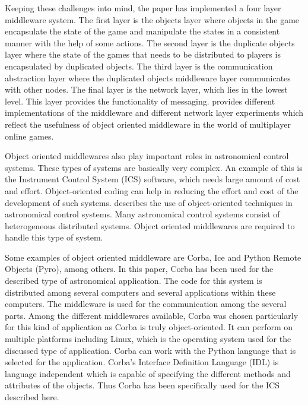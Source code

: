 \documentclass{acm_proc_article-sp}
\begin{document}
Keeping these challenges into mind, the paper has implemented a four layer middleware system. The first layer is the objects layer where objects in the game encapsulate the state of the game and manipulate the states in a consistent manner with the help of some actions. The second layer is the duplicate objects layer where the state of the games that needs to be distributed to players is encapsulated by duplicated objects. The third layer is the communication abstraction layer where the duplicated objects middleware layer communicates with other nodes. The final layer is the network layer, which lies in the lowest level. This layer provides the functionality of messaging. \cite{Denault:2008p8364} provides different implementations of the middleware and different network layer experiments which reflect the usefulness of object oriented middleware in the world of multiplayer online games.




Object oriented middlewares also play important roles in astronomical control systems. These types of systems are basically very complex. An example of this is the Instrument Control System (ICS) software, which needs large amount of cost and effort. Object-oriented coding can help in reducing the effort and cost of the development of such systems. \cite{Dipper:2004p8366} describes the use of object-oriented techniques in astronomical control systems. Many astronomical control systems consist of heterogeneous distributed systems. Object oriented middlewares are required to handle this type of system.

Some examples of object oriented middleware are Corba, Ice and Python Remote Objects (Pyro), among others. In this paper, Corba has been used for the described type of astronomical application. The code for this system is distributed among several computers and several applications within these computers. The middleware is used for the communication among the several parts. Among the different middlewares available, Corba was chosen particularly for this kind of application as Corba is truly object-oriented. It can perform on multiple platforms including Linux, which is the operating system used for the discussed type of application.  Corba can work with the Python language that is selected for the application. Corba's Interface Definition Language (IDL) is language independent which is capable of specifying the different methods and attributes of the objects. Thus Corba has been specifically used for the ICS described here.
\end{document}
